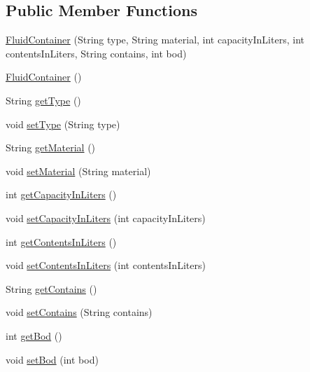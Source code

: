 \subsection*{Public Member Functions}
\begin{DoxyCompactItemize}
\item 
\mbox{\hyperlink{classdomain_1_1model_1_1FluidContainer_a9e020728f4539c8765bf53cb499e989c}{Fluid\+Container}} (String type, String material, int capacity\+In\+Liters, int contents\+In\+Liters, String contains, int bod)
\item 
\mbox{\hyperlink{classdomain_1_1model_1_1FluidContainer_a4c012c63419944de3290022b898813fe}{Fluid\+Container}} ()
\item 
String \mbox{\hyperlink{classdomain_1_1model_1_1FluidContainer_ade44b483db79e138aaf0869db94e25b7}{get\+Type}} ()
\item 
void \mbox{\hyperlink{classdomain_1_1model_1_1FluidContainer_ae642ca46635c455fd99130523311c47e}{set\+Type}} (String type)
\item 
String \mbox{\hyperlink{classdomain_1_1model_1_1FluidContainer_a696e99ccedb2ad938c70a612de3b58ba}{get\+Material}} ()
\item 
void \mbox{\hyperlink{classdomain_1_1model_1_1FluidContainer_a19c361d9b2401e83ee4dd5fa81ebfef3}{set\+Material}} (String material)
\item 
int \mbox{\hyperlink{classdomain_1_1model_1_1FluidContainer_aa0cc7fc98df2d11e7951cf96884f1867}{get\+Capacity\+In\+Liters}} ()
\item 
void \mbox{\hyperlink{classdomain_1_1model_1_1FluidContainer_acd91444886b9c4bb3bdd87c86c58e5c3}{set\+Capacity\+In\+Liters}} (int capacity\+In\+Liters)
\item 
int \mbox{\hyperlink{classdomain_1_1model_1_1FluidContainer_ad57f479517dd4bc6a9e6cc426153ccc7}{get\+Contents\+In\+Liters}} ()
\item 
void \mbox{\hyperlink{classdomain_1_1model_1_1FluidContainer_ad351ec4fde617dd16a8f6a18dd38ff0d}{set\+Contents\+In\+Liters}} (int contents\+In\+Liters)
\item 
String \mbox{\hyperlink{classdomain_1_1model_1_1FluidContainer_a4f283e636a43590fc7a4e8faf3e330b2}{get\+Contains}} ()
\item 
void \mbox{\hyperlink{classdomain_1_1model_1_1FluidContainer_aa37c1ba62fbd5f93931bb11acdef23c5}{set\+Contains}} (String contains)
\item 
int \mbox{\hyperlink{classdomain_1_1model_1_1FluidContainer_ae4b6c4c348c94e2de708038d5e2191a1}{get\+Bod}} ()
\item 
void \mbox{\hyperlink{classdomain_1_1model_1_1FluidContainer_ad8f286fc538c6dbecc2c71542d2e3fda}{set\+Bod}} (int bod)
\end{DoxyCompactItemize}

